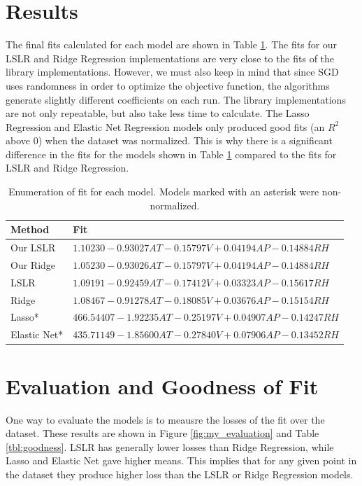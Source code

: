 \documentclass[letterpaper]{article} %
\begin{document}
\section{Results}
The final fits calculated for each model are shown in Table \ref{tbl:fits}.
The fits for our LSLR and Ridge Regression implementations
are very close to the fits of the library implementations.
However, we must also keep in mind that since SGD uses randomness in order to optimize the objective function,
the algorithms generate slightly different coefficients on each run.
The library implementations are not only repeatable, but also take less time
to calculate.
The Lasso Regression and Elastic Net Regression models only produced
good fits (an $R^2$ above 0) when the dataset was normalized.
This is why there is a significant difference in the fits for the models
shown in Table \ref{tbl:fits} compared to the fits for LSLR and Ridge Regression.

\begin{table}[t]
\begin{centering}
\bgroup
\def\arraystretch{1.5}
\begin{tabular}{| m{} | m{} |} 
\hline
Method & Fit \\ 
\hline
\hline
Our LSLR & $1.10230 - 0.93027AT - 0.15797V + 0.04194AP - 0.14884RH$ \\
\hline
Our Ridge & $1.05230 - 0.93026AT - 0.15797V + 0.04194AP - 0.14884RH$ \\
\hline
LSLR & $1.09191 - 0.92459AT - 0.17412V + 0.03323AP - 0.15617RH$ \\
\hline
Ridge & $1.08467 - 0.91278AT - 0.18085V + 0.03676AP - 0.15154RH$ \\
\hline
Lasso* & $466.54407 - 1.92235AT - 0.25197V + 0.04907AP - 0.14247RH$ \\
\hline
Elastic Net* & $435.71149 - 1.85600AT - 0.27840V + 0.07906AP - 0.13452RH$ \\
\hline
\end{tabular}
\caption{Enumeration of fit for each model. Models marked with an asterisk
were non-normalized.}
\label{tbl:fits}
\egroup
\end{centering}
\end{table}

\section{Evaluation and Goodness of Fit}
One way to evaluate the models is to meausre the losses of the
fit over the dataset. These results are shown in Figure \ref{fig:my_evaluation}
and Table \ref{tbl:goodness}.
LSLR has generally lower losses than Ridge Regression,
while Lasso and Elastic Net gave higher means.
This implies that for any given point in the dataset they produce higher loss
than the LSLR or Ridge Regression models.
\end{document}

